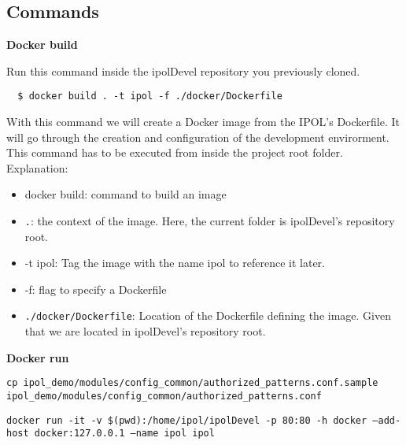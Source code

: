 \documentclass[a4paper,12pt]{article}
\begin{document}
\subsection{Commands}
\label{sec:docker_commands}

\textbf{Docker build}

Run this command inside the ipolDevel repository you previously cloned.

\begin{verbatim}
  $ docker build . -t ipol -f ./docker/Dockerfile
\end{verbatim}

With this command we will create a Docker image from the IPOL's Dockerfile. It will go through the creation and configuration of the development envirorment. This command has to be executed from inside the project root folder. Explanation:
\begin{itemize}
  \item docker build: command to build an image
  \item {\tt .}: the context of the image. Here, the current folder is ipolDevel's repository root.
  \item -t ipol: Tag the image with the name ipol to reference it later.
  \item -f: flag to specify a Dockerfile
  \item {\tt ./docker/Dockerfile}: Location of the Dockerfile defining the image. Given that we are located in ipolDevel's repository root.
\end{itemize}

\textbf{Docker run}

  {\tt cp ipol\_demo/modules/config\_common/authorized\_patterns.conf.sample ipol\_demo/modules/config\_common/authorized\_patterns.conf}
  
  {\tt docker run -it -v \$(pwd):/home/ipol/ipolDevel -p 80:80 -h docker --add-host docker:127.0.0.1 --name ipol ipol}
\end{document}

